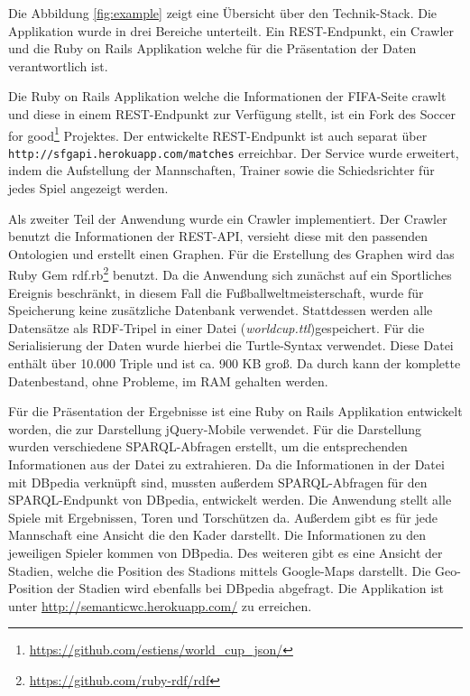 \documentclass[runningheads,a4paper]{llncs}
\begin{document}
Die Abbildung \ref{fig:example} zeigt eine Übersicht über den Technik-Stack. Die Applikation wurde in drei Bereiche unterteilt. Ein REST-Endpunkt, ein Crawler und die Ruby on Rails Applikation welche für die Präsentation der Daten verantwortlich ist.

Die Ruby on Rails Applikation welche die Informationen der FIFA-Seite crawlt und diese in einem REST-Endpunkt zur Verfügung stellt, ist ein Fork des Soccer for good\footnote{\url{https://github.com/estiens/world_cup_json/}} Projektes. Der entwickelte REST-Endpunkt ist auch separat über \texttt{http://sfgapi.herokuapp.com/matches} erreichbar. Der Service wurde erweitert, indem die Aufstellung der Mannschaften, Trainer sowie die Schiedsrichter für jedes Spiel angezeigt werden. 

Als zweiter Teil der Anwendung wurde ein Crawler implementiert. Der Crawler benutzt die Informationen der REST-API, versieht diese mit den passenden Ontologien und erstellt einen Graphen. Für die Erstellung des Graphen wird das Ruby Gem rdf.rb\footnote{\url{https://github.com/ruby-rdf/rdf}} benutzt. Da die Anwendung sich zunächst auf ein Sportliches Ereignis beschränkt, in diesem Fall die Fußballweltmeisterschaft, wurde für Speicherung keine zusätzliche Datenbank verwendet. Stattdessen werden alle Datensätze als RDF-Tripel in einer Datei (\textit{worldcup.ttl})gespeichert. Für die Serialisierung der Daten wurde hierbei die Turtle-Syntax verwendet. Diese Datei enthält über 10.000 Triple und ist ca. 900 KB groß. Da durch kann der komplette Datenbestand, ohne Probleme, im RAM gehalten werden.

Für die Präsentation der Ergebnisse ist eine Ruby on Rails Applikation entwickelt worden, die zur Darstellung jQuery-Mobile verwendet. Für die Darstellung wurden verschiedene SPARQL-Abfragen erstellt, um die entsprechenden Informationen aus der Datei zu extrahieren. Da die Informationen in der Datei mit DBpedia verknüpft sind, mussten außerdem SPARQL-Abfragen für den SPARQL-Endpunkt von DBpedia, entwickelt werden. Die Anwendung stellt alle Spiele mit Ergebnissen, Toren und Torschützen da. Außerdem gibt es für jede Mannschaft eine Ansicht die den Kader darstellt. Die Informationen zu den jeweiligen Spieler kommen von DBpedia. Des weiteren gibt es eine Ansicht der Stadien, welche die Position des Stadions mittels Google-Maps darstellt. Die Geo-Position der Stadien wird ebenfalls bei DBpedia abgefragt. Die Applikation ist unter \url{http://semanticwc.herokuapp.com/} zu erreichen.
\end{document}
